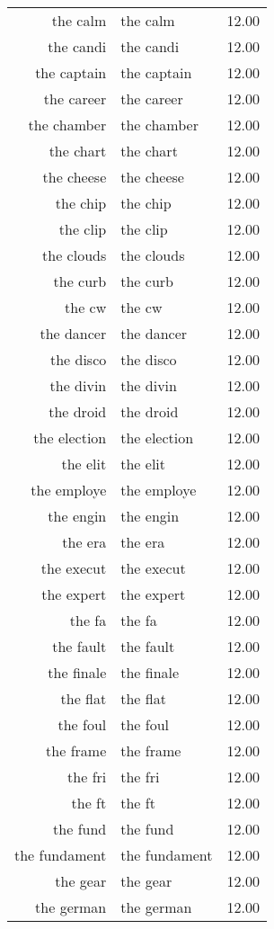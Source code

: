 \begin{table}[ht]
\begin{tabular}{rlr}
  the calm & the calm & 12.00 \\ 
  the candi & the candi & 12.00 \\ 
  the captain & the captain & 12.00 \\ 
  the career & the career & 12.00 \\ 
  the chamber & the chamber & 12.00 \\ 
  the chart & the chart & 12.00 \\ 
  the cheese & the cheese & 12.00 \\ 
  the chip & the chip & 12.00 \\ 
  the clip & the clip & 12.00 \\ 
  the clouds & the clouds & 12.00 \\ 
  the curb & the curb & 12.00 \\ 
  the cw & the cw & 12.00 \\ 
  the dancer & the dancer & 12.00 \\ 
  the disco & the disco & 12.00 \\ 
  the divin & the divin & 12.00 \\ 
  the droid & the droid & 12.00 \\ 
  the election & the election & 12.00 \\ 
  the elit & the elit & 12.00 \\ 
  the employe & the employe & 12.00 \\ 
  the engin & the engin & 12.00 \\ 
  the era & the era & 12.00 \\ 
  the execut & the execut & 12.00 \\ 
  the expert & the expert & 12.00 \\ 
  the fa & the fa & 12.00 \\ 
  the fault & the fault & 12.00 \\ 
  the finale & the finale & 12.00 \\ 
  the flat & the flat & 12.00 \\ 
  the foul & the foul & 12.00 \\ 
  the frame & the frame & 12.00 \\ 
  the fri & the fri & 12.00 \\ 
  the ft & the ft & 12.00 \\ 
  the fund & the fund & 12.00 \\ 
  the fundament & the fundament & 12.00 \\ 
  the gear & the gear & 12.00 \\ 
  the german & the german & 12.00 \\ 

\end{tabular}
\end{table}
